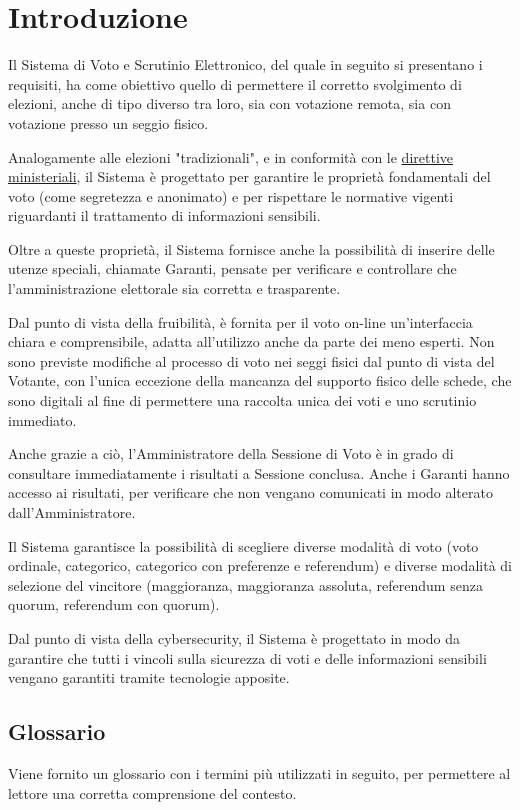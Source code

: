 \chapter{Introduzione}

Il Sistema di Voto e Scrutinio Elettronico, del quale in seguito si presentano i requisiti, ha come obiettivo quello di permettere il corretto svolgimento di elezioni, anche di tipo diverso tra loro, sia con votazione remota, sia con votazione presso un seggio fisico.

Analogamente alle elezioni "tradizionali", e in conformità con le \href{https://www.interno.gov.it/sites/default/files/2021-07/linee_guida_voto_elettronico_decreto_9.7.2021.pdf}{direttive ministeriali}, il Sistema è progettato per garantire le proprietà fondamentali del voto (come segretezza e anonimato) e per rispettare le normative vigenti riguardanti il trattamento di informazioni sensibili. 

Oltre a queste proprietà, il Sistema fornisce anche la possibilità di inserire delle utenze speciali, chiamate Garanti, pensate per verificare e controllare che l'amministrazione elettorale sia corretta e trasparente. 

Dal punto di vista della fruibilità, è fornita per il voto on-line un'interfaccia chiara e comprensibile, adatta all'utilizzo anche da parte dei meno esperti. Non sono previste modifiche al processo di voto nei seggi fisici dal punto di vista del Votante, con l'unica eccezione della mancanza del supporto fisico delle schede, che sono digitali al fine di permettere una raccolta unica dei voti e uno scrutinio immediato.

Anche grazie a ciò, l'Amministratore della Sessione di Voto è in grado di consultare immediatamente i risultati a Sessione conclusa. Anche i Garanti hanno accesso ai risultati, per verificare che non vengano comunicati in modo alterato dall'Amministratore.

Il Sistema garantisce la possibilità di scegliere diverse modalità di voto (voto ordinale, categorico, categorico con preferenze e referendum) e diverse modalità di selezione del vincitore (maggioranza, maggioranza assoluta, referendum senza quorum, referendum con quorum).

Dal punto di vista della cybersecurity, il Sistema è progettato in modo da garantire che tutti i vincoli sulla sicurezza di voti e delle informazioni sensibili vengano garantiti tramite tecnologie apposite.

\section{Glossario}
Viene fornito un glossario con i termini più utilizzati in seguito, per permettere al lettore una corretta comprensione del contesto.

